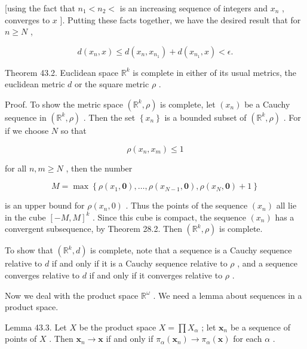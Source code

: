 [using the fact that \({n}_{1} < {n}_{2} <\) is an increasing sequence of integers and \({x}_{n}\) , converges to \(x\) ]. Putting these facts together, we have the desired result that for \(n \geq  N\) ,

\[
d\left( {{x}_{n},x}\right)  \leq  d\left( {{x}_{n},{x}_{{n}_{1}}}\right)  + d\left( {{x}_{{n}_{1}},x}\right)  < \epsilon .
\]

Theorem 43.2. Euclidean space \({\mathbb{R}}^{k}\) is complete in either of its usual metrics, the euclidean metric \(d\) or the square metric \(\rho\) .

Proof. To show the metric space \(\left( {{\mathbb{R}}^{k},\rho }\right)\) is complete, let \(\left( {x}_{n}\right)\) be a Cauchy sequence in \(\left( {{\mathbb{R}}^{k},\rho }\right)\) . Then the set \(\left\{  {x}_{n}\right\}\) is a bounded subset of \(\left( {{\mathbb{R}}^{k},\rho }\right)\) . For if we choose \(N\) so that

\[
\rho \left( {{x}_{n},{x}_{m}}\right)  \leq  1
\]

for all \(n,m \geq  N\) , then the number

\[
M = \max \left\{  {\rho \left( {{x}_{1},\mathbf{0}}\right) ,\ldots ,\rho \left( {{x}_{N - 1},\mathbf{0}}\right) ,\rho \left( {{x}_{N},\mathbf{0}}\right)  + 1}\right\}
\]

is an upper bound for \(\rho \left( {{x}_{n},0}\right)\) . Thus the points of the sequence \(\left( {x}_{n}\right)\) all lie in the cube \({\left\lbrack  -M,M\right\rbrack  }^{k}\) . Since this cube is compact, the sequence \(\left( {x}_{n}\right)\) has a convergent subsequence, by Theorem 28.2. Then \(\left( {{\mathbb{R}}^{k},\rho }\right)\) is complete.

To show that \(\left( {{\mathbb{R}}^{k},d}\right)\) is complete, note that a sequence is a Cauchy sequence relative to \(d\) if and only if it is a Cauchy sequence relative to \(\rho\) , and a sequence converges relative to \(d\) if and only if it converges relative to \(\rho\) .

Now we deal with the product space \({\mathbb{R}}^{\omega }\) . We need a lemma about sequences in a product space.

Lemma 43.3. Let \(X\) be the product space \(X = \prod {X}_{\alpha }\) ; let \({\mathbf{x}}_{n}\) be a sequence of points of \(X\) . Then \({\mathbf{x}}_{n} \rightarrow  \mathbf{x}\) if and only if \({\pi }_{\alpha }\left( {\mathbf{x}}_{n}\right)  \rightarrow  {\pi }_{\alpha }\left( \mathbf{x}\right)\) for each \(\alpha\) .

